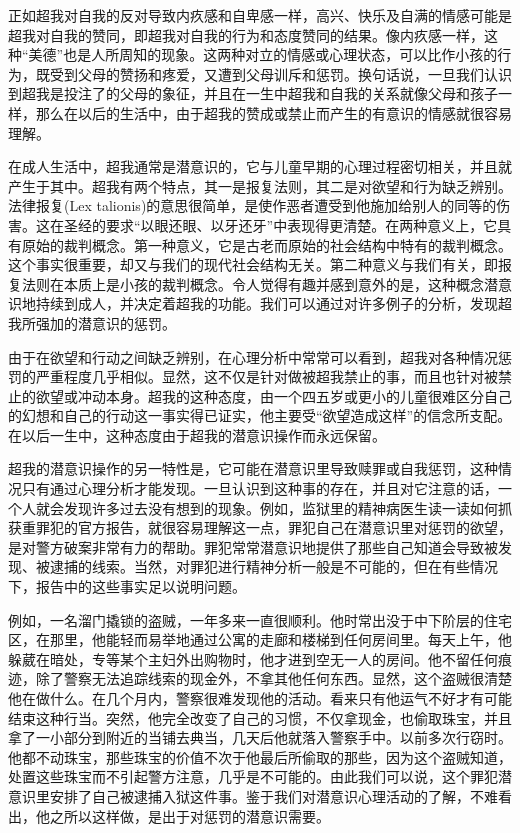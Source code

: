 \documentclass[UTF8,10pt,a4paper,openany]{book}
\begin{document}
正如超我对自我的反对导致内疚感和自卑感一样，高兴、快乐及自满的情感可能是超我对自我的赞同，即超我对自我的行为和态度赞同的结果。像内疚感一样，这种“美德”也是人所周知的现象。这两种对立的情感或心理状态，可以比作小孩的行为，既受到父母的赞扬和疼爱，又遭到父母训斥和惩罚。换句话说，一旦我们认识到超我是投注了的父母的象征，并且在一生中超我和自我的关系就像父母和孩子一样，那么在以后的生活中，由于超我的赞成或禁止而产生的有意识的情感就很容易理解。

在成人生活中，超我通常是潜意识的，它与儿童早期的心理过程密切相关，并且就产生于其中。超我有两个特点，其一是报复法则，其二是对欲望和行为缺乏辨别。
法律报复(Lex talionis)的意思很简单，是使作恶者遭受到他施加给别人的同等的伤害。这在圣经的要求“以眼还眼、以牙还牙”中表现得更清楚。在两种意义上，它具有原始的裁判概念。第一种意义，它是古老而原始的社会结构中特有的裁判概念。这个事实很重要，却又与我们的现代社会结构无关。第二种意义与我们有关，即报复法则在本质上是小孩的裁判概念。令人觉得有趣并感到意外的是，这种概念潜意识地持续到成人，并决定着超我的功能。我们可以通过对许多例子的分析，发现超我所强加的潜意识的惩罚。

由于在欲望和行动之间缺乏辨别，在心理分析中常常可以看到，超我对各种情况惩罚的严重程度几乎相似。显然，这不仅是针对做被超我禁止的事，而且也针对被禁止的欲望或冲动本身。超我的这种态度，由一个四五岁或更小的儿童很难区分自己的幻想和自己的行动这一事实得已证实，他主要受“欲望造成这样”的信念所支配。在以后一生中，这种态度由于超我的潜意识操作而永远保留。

超我的潜意识操作的另一特性是，它可能在潜意识里导致赎罪或自我惩罚，这种情况只有通过心理分析才能发现。一旦认识到这种事的存在，并且对它注意的话，一个人就会发现许多过去没有想到的现象。例如，监狱里的精神病医生读一读如何抓获重罪犯的官方报告，就很容易理解这一点，罪犯自己在潜意识里对惩罚的欲望，是对警方破案非常有力的帮助。罪犯常常潜意识地提供了那些自己知道会导致被发现、被逮捕的线索。当然，对罪犯进行精神分析一般是不可能的，但在有些情况下，报告中的这些事实足以说明问题。

例如，一名溜门撬锁的盗贼，一年多来一直很顺利。他时常出没于中下阶层的住宅区，在那里，他能轻而易举地通过公寓的走廊和楼梯到任何房间里。每天上午，他躲葳在暗处，专等某个主妇外出购物时，他才进到空无一人的房间。他不留任何痕迹，除了警察无法追踪线索的现金外，不拿其他任何东西。显然，这个盗贼很清楚他在做什么。在几个月内，警察很难发现他的活动。看来只有他运气不好才有可能结束这种行当。突然，他完全改变了自己的习惯，不仅拿现金，也偷取珠宝，并且拿了一小部分到附近的当铺去典当，几天后他就落入警察手中。以前多次行窃时。他都不动珠宝，那些珠宝的价值不次于他最后所偷取的那些，因为这个盗贼知道，处置这些珠宝而不引起警方注意，几乎是不可能的。由此我们可以说，这个罪犯潜意识里安排了自己被逮捕入狱这件事。鉴于我们对潜意识心理活动的了解，不难看出，他之所以这样做，是出于对惩罚的潜意识需要。
\end{document}
